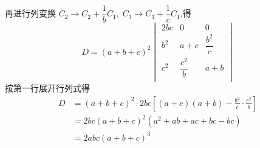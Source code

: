 \begin{questions}
\begin{solution}
\[        \]
        再进行列变换 \( C_2 \rightarrow C_2 + \dfrac{1}{b}C_1,\; C_3 \rightarrow C_3 + \dfrac{1}{c}C_1 \),得
        \[
        D = (a+b+c)^2 \begin{vmatrix}
        2bc & 0 & 0 \\
        b^2 & a+c & \dfrac{b^2}{c} \\
        c^2 & \dfrac{c^2}{b} & a+b \\
        \end{vmatrix}
        \]
        按第一行展开行列式得
        \begin{align*}
        D &= (a+b+c)^2 \cdot 2bc \left[(a+c)(a+b) - \frac{b^2}{c} \cdot \frac{c^2}{b} \right] \\
        &= 2bc(a+b+c)^2 \left(a^2 + ab + ac + bc - bc \right) \\
        &= 2abc(a+b+c)^3
        \end{align*}
    \end{solution}


\end{questions}
